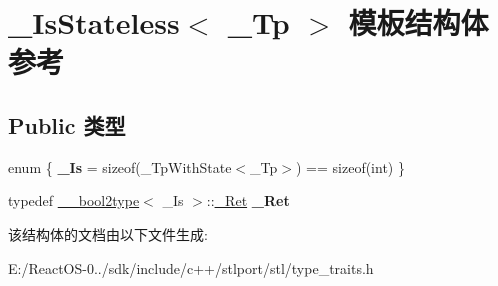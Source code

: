 \hypertarget{struct___is_stateless}{}\section{\+\_\+\+Is\+Stateless$<$ \+\_\+\+Tp $>$ 模板结构体 参考}
\label{struct___is_stateless}
\subsection*{Public 类型}
\begin{DoxyCompactItemize}
\item 
\mbox{\label{struct___is_stateless_a69b6c8845a54488b7b8d8e2f5d0e2fb0}} 
enum \{ {\bfseries \+\_\+\+Is} = sizeof(\+\_\+\+Tp\+With\+State$<$\+\_\+\+Tp$>$) == sizeof(int)
 \}
\item 
\mbox{\label{struct___is_stateless_a6b50b42c69d2f65780ab14a00fdc588a}} 
typedef \hyperlink{struct____bool2type}{\+\_\+\+\_\+bool2type}$<$ \+\_\+\+Is $>$\+::\hyperlink{struct____true__type}{\+\_\+\+Ret} {\bfseries \+\_\+\+Ret}
\end{DoxyCompactItemize}


该结构体的文档由以下文件生成\+:\begin{DoxyCompactItemize}
\item 
E\+:/\+React\+O\+S-\/0../sdk/include/c++/stlport/stl/type\+\_\+traits.\+h\end{DoxyCompactItemize}
